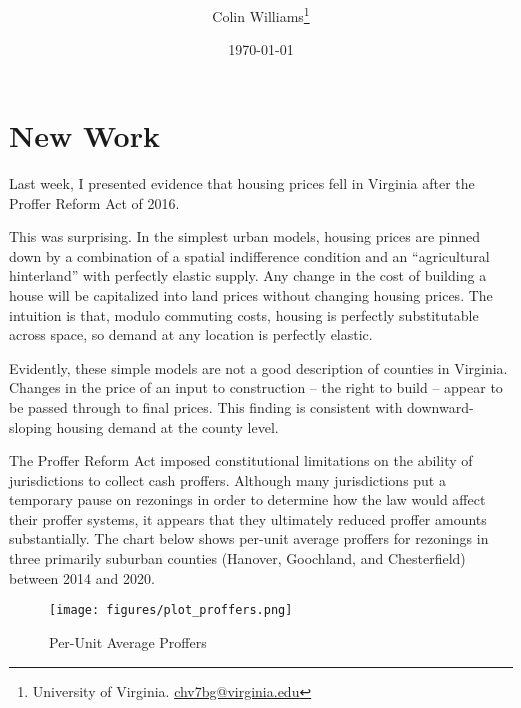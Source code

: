 \documentclass[12pt]{article}
\title{ \vspace*{-2.5cm} \hspace*{-0.5cm} }
\author{Colin Williams\thanks{University of Virginia.
\href{mailto:chv7bg@virginia.edu}{chv7bg@virginia.edu}}}
\date{ \vspace*{0.5cm} \today} %
\begin{document}
\bgroup
\let\footnoterule\relax

\maketitle

\begin{abstract}
\noindent 
\end{abstract}


\noindent 

\section{New Work}  \label{sec:data}

Last week, I presented evidence that housing prices fell in Virginia after the Proffer Reform Act of 2016. 

This was surprising. In the simplest urban models, housing prices are pinned down by a combination of a spatial indifference condition and an ``agricultural hinterland'' with perfectly elastic supply. Any change in the cost of building a house will be capitalized into land prices without changing housing prices. The intuition is that, modulo commuting costs, housing is perfectly substitutable across space, so demand at any location is perfectly elastic.

Evidently, these simple models are not a good description of counties in Virginia. Changes in the price of an input to construction -- the right to build -- appear to be passed through to final prices. This finding is consistent with downward-sloping housing demand at the county level.

The Proffer Reform Act imposed constitutional limitations on the ability of jurisdictions to collect cash proffers. Although many jurisdictions put a temporary pause on rezonings in order to determine how the law would affect their proffer systems, it appears that they ultimately reduced proffer amounts substantially. The chart below shows per-unit average proffers for rezonings in three primarily suburban counties (Hanover, Goochland, and Chesterfield) between 2014 and 2020.

\begin{figure}[h]
    \caption{Per-Unit Average Proffers}
    \texttt{[image: figures/plot\_proffers.png]}
\end{figure}
\end{document}
